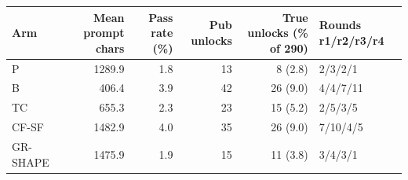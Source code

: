 \begin{tabular}{l r r r r l}
\toprule
Arm & Mean prompt chars & Pass rate (\%) & Pub unlocks & True unlocks (\% of 290) & Rounds r1/r2/r3/r4 \\
\midrule
P & 1289.9 & 1.8 & 13 & 8 (2.8) & 2/3/2/1 \\
B & 406.4 & 3.9 & 42 & 26 (9.0) & 4/4/7/11 \\
TC & 655.3 & 2.3 & 23 & 15 (5.2) & 2/5/3/5 \\
CF-SF & 1482.9 & 4.0 & 35 & 26 (9.0) & 7/10/4/5 \\
GR-SHAPE & 1475.9 & 1.9 & 15 & 11 (3.8) & 3/4/3/1 \\
\bottomrule
\end{tabular}
